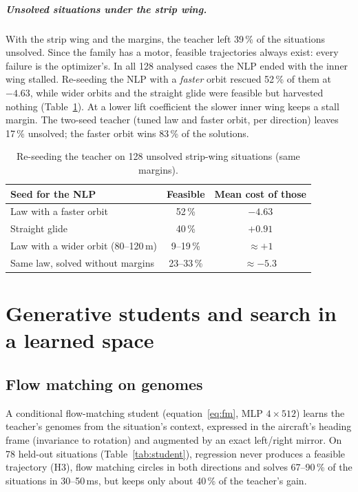 \documentclass[11pt,a4paper,oneside]{report}
\begin{document}
\paragraph{Unsolved situations under the strip wing.} With the strip wing and the margins, the teacher left 39\,\% of the situations unsolved. Since the family has a motor, feasible trajectories always exist: every failure is the optimizer's. In all 128 analysed cases the NLP ended with the inner wing stalled. Re-seeding the NLP with a \emph{faster} orbit rescued 52\,\% of them at $-4.63$, while wider orbits and the straight glide were feasible but harvested nothing (Table~\ref{tab:unsolved}). At a lower lift coefficient the slower inner wing keeps a stall margin. The two-seed teacher (tuned law and faster orbit, per direction) leaves 17\,\% unsolved; the faster orbit wins 83\,\% of the solutions.

\begin{table}[ht]\centering\small
\caption{Re-seeding the teacher on 128 unsolved strip-wing situations (same margins).}\label{tab:unsolved}
\begin{tabular}{@{}lcc@{}}
\toprule
Seed for the NLP & Feasible & Mean cost of those \\ \midrule
Law with a faster orbit & 52\,\% & $-4.63$ \\
Straight glide & 40\,\% & $+0.91$ \\
Law with a wider orbit (80--120\,m) & 9--19\,\% & $\approx +1$ \\
Same law, solved without margins & 23--33\,\% & $\approx -5.3$ \\
\bottomrule
\end{tabular}
\end{table}

\chapter{Generative students and search in a learned space}\label{ch:student}

\section{Flow matching on genomes}
A conditional flow-matching student (equation~\eqref{eq:fm}, MLP $4\times512$) learns the teacher's genomes from the situation's context, expressed in the aircraft's heading frame (invariance to rotation) and augmented by an exact left/right mirror. On 78 held-out situations (Table~\ref{tab:student}), regression never produces a feasible trajectory (H3), flow matching circles in both directions and solves 67--90\,\% of the situations in 30--50\,ms, but keeps only about 40\,\% of the teacher's gain.
\end{document}
